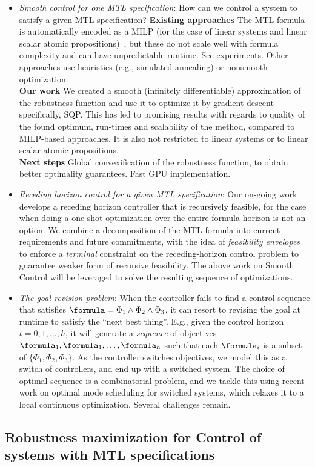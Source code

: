 \begin{itemize}
\item \textit{Smooth control for one MTL specification}: How can we control a system to satisfy a given MTL specification?
\textbf{Existing approaches} The MTL formula is automatically encoded as a MILP (for the case of linear systems and linear scalar atomic propositions)~\cite{Raman14_MPCSTL}, but these do not scale well with formula complexity and can have unpredictable runtime. See experiments.
Other approaches use heuristics (e.g., simulated annealing) or nonsmooth optimization.
\\
\textbf{Our work} We created a smooth (infinitely differentiable) approximation of the robustness function and use it to optimize it by gradient descent~\cite{PantAM17_SmoothOpTechRpt} - specifically, SQP.
This has led to promising results with regards to quality of the found optimum, run-times and scalability of the method, compared to MILP-based approaches. It is also not restricted to linear systems or to linear scalar atomic propositions.
\\
\textbf{Next steps} Global convexification of the robustness function, to obtain better optimality guarantees. Fast GPU implementation.

\item \textit{Receding horizon control for a given MTL specification}: Our on-going work develops a receding horizon controller that is recursively feasible, for the case when doing a one-shot optimization over the entire formula horizon is not an option. 
We combine a decomposition of the MTL formula into current requirements and future commitments, with the idea of \textit{feasibility envelopes}\cite{Belta_FE_CDC16} to enforce a \textit{terminal} constraint on the receding-horizon control problem to guarantee weaker form of recursive feasibility. 
The above work on Smooth Control will be leveraged to solve the resulting sequence of optimizations.

\item \textit{The goal revision problem}: When the controller fails to find a control sequence that satisfies $\formula=\Phi_1 \land \Phi_2 \land \Phi_3$, it can resort to revising the goal at runtime to satisfy the ``next best thing''.
E.g., given the control horizon $t=0,1,\ldots,h$, it will generate a \textit{sequence} of objectives $\formula_1,\formula_1,\ldots,\formula_h$ such that each $\formula_i$ is a subset of $\{\Phi_1 , \Phi_2 , \Phi_3\}$.
As the controller switches objectives, we model this as a switch of controllers, and end up with a switched system.
The choice of optimal sequence is a combinatorial problem, and we tackle this using recent work on optimal mode scheduling for switched systems, which relaxes it to a local continuous optimization.
Several challenges remain.

\end{itemize}

\subsection{Robustness maximization for Control of systems with MTL specifications}

